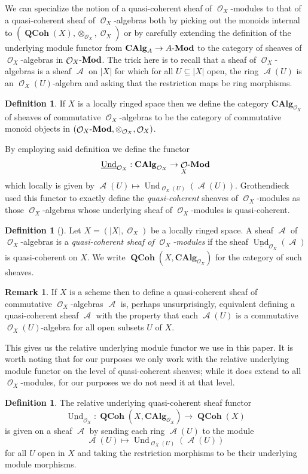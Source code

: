 \documentclass{amsart}
\theoremstyle{definition}
\newtheorem{remark}[equation]{Remark}
\newtheorem{definition}[equation]{Definition}
\DeclareMathOperator{\Ascr}{\mathscr{A}}
\DeclareMathOperator{\Ocal}{\mathcal{O}}
\DeclareMathOperator{\und}{Und}
\newcommand{\CAlg}[1]{\mathbf{CAlg}_{#1}}
\newcommand{\Und}[1]{\und_{#1}}
\newcommand{\RelUnd}[1]{\underline{\und}_{{#1}}}
\DeclareMathOperator{\QCoh}{\mathbf{QCoh}}
\newcommand{\Mod}[1]{{#1}\textnormal{-}\mathbf{Mod}}
\numberwithin{equation}{subsection}
\begin{document}
We can specialize the notion of a quasi-coherent sheaf of $\Ocal_X$-modules to that of a quasi-coherent sheaf of $\Ocal_X$-algebras both by picking out the monoids internal to $(\QCoh(X),\otimes_{\Ocal_X},\Ocal_X)$ or by carefully extending the definition of the underlying module functor from $\CAlg{A} \to \Mod{A}$ to the category of sheaves of $\Ocal_X$-algebras in $\Mod{\Ocal_X}$.
The trick here is to recall that a sheaf of $\Ocal_X$-algebras is a sheaf $\Ascr$ on $\lvert X \rvert$ for which for all $U \subseteq \lvert X \rvert$ open, the ring $\Ascr(U)$ is an $\Ocal_X(U)$-algebra and asking that the restriction maps be ring morphisms.
\begin{definition}\label{Defn: Section Background Scheme: QCoh Algebras Defn Internal}
	If $X$ is a locally ringed space then we define the category $\CAlg{\Ocal_X}$ of sheaves of commutative $\Ocal_X$-algebras to be the category of commutative monoid objects in $(\Mod{\Ocal_X}, \otimes_{\Ocal_X}, \Ocal_X)$.
\end{definition}

By employing said definition we define the functor
\[
\RelUnd{\Ocal_X}:\CAlg{\Ocal_X} \to \Mod{\Ocal_X}
\]
which locally is given by $\Ascr(U) \mapsto \Und{\Ocal_X(U)}(\Ascr(U))$. Grothendieck used this functor to exactly define the \emph{quasi-coherent} sheaves of $\Ocal_X$-modules as those $\Ocal_X$-algebras whose underlying sheaf of $\Ocal_X$-modules is quasi-coherent.
\begin{definition}[{\cite[Section 1.5.3, Sentence 3]{EGA01}}]\label{Defn: Section Background Scheme: QCoh Algebras}
Let $X = (\lvert X \rvert, \Ocal_X)$ be a locally ringed space. A sheaf $\Ascr$ of $\Ocal_X$-algebras is a \emph{quasi-coherent sheaf of $\Ocal_X$-modules} if the sheaf $\RelUnd{\Ocal_X}(\Ascr)$ is quasi-coherent on $X$. We write $\QCoh(X,\CAlg{\Ocal_X})$ for the category of such sheaves.
\end{definition}
\begin{remark}
	If $X$ is a scheme then to define a quasi-coherent sheaf of  commutative $\Ocal_X$-algebras $\Ascr$ is, perhaps unsurprisingly, equivalent defining a quasi-coherent sheaf $\Ascr$ with the property that each $\Ascr(U)$ is a commutative $\Ocal_X(U)$-algebra for all open subsets $U$ of $X$.
\end{remark}

This gives us the relative underlying module functor we use in this paper. It is worth noting that for our purposes we only work with the relative underlying module functor on the level of quasi-coherent sheaves; while it does extend to all $\Ocal_X$-modules, for our purposes we do not need it at that level.
\begin{definition}\label{Defn: Section Kahlers and Quasi Coherent Sheaves}
The relative underlying quasi-coherent sheaf functor 
\[
\RelUnd{\Ocal_X}:\QCoh\left(X,\CAlg{\Ocal_X}\right) \longrightarrow \QCoh(X)
\]
is given on a sheaf $\Ascr$ by sending each ring $\Ascr(U)$ to the module
\[
\Ascr(U) \mapsto \Und{\Ocal_X(U)}\left(\Ascr(U)\right)
\]
for all $U$ open in $X$ and taking the restriction morphisms to be their underlying module morphisms.
\end{definition}
\end{document}
